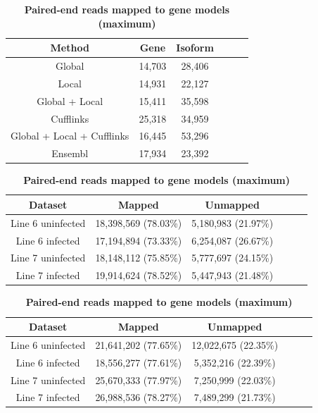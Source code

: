\documentclass[10pt]{article}
\begin{document}
\begin{table}[!ht]
\caption{
\bf{Number of putative genes and isoforms}}
\begin{tabular}{cccccc}
\hline
Method& Gene & Isoform \\ 
\hline
Global & 14,703 & 28,406 \\
Local & 14,931 & 22,127 \\
Global + Local & 15,411 & 35,598 \\
Cufflinks & 25,318 & 34,959 \\
Global + Local + Cufflinks & 16,445 & 53,296\\
Ensembl & 17,934 & 23,392 \\
\hline
\end{tabular}
\label{genes_transcripts}

\caption{
\bf{Single-end reads mapped to gene models (maximum)}}
\begin{tabular}{cccccc}
\hline
Dataset & Mapped & Unmapped \\
\hline
Line 6 uninfected & 18,398,569 (78.03\%) & 5,180,983 (21.97\%) \\
Line 6 infected & 17,194,894 (73.33\%) & 6,254,087 (26.67\%) \\
Line 7 uninfected & 18,148,112 (75.85\%) & 5,777,697 (24.15\%) \\
Line 7 infected & 19,914,624 (78.52\%) & 5,447,943 (21.48\%) \\
\hline
\end{tabular}
\label{single-end_map}

\caption{
\bf{Paired-end reads mapped to gene models (maximum)}}
\begin{tabular}{cccccc}
\hline
Dataset & Mapped & Unmapped \\
\hline
Line 6 uninfected & 21,641,202 (77.65\%) & 12,022,675 (22.35\%) \\
Line 6 infected & 18,556,277 (77.61\%) & 5,352,216 (22.39\%) \\
Line 7 uninfected & 25,670,333 (77.97\%) & 7,250,999 (22.03\%) \\
Line 7 infected & 26,988,536 (78.27\%) & 7,489,299 (21.73\%) \\
\hline
\end{tabular}
\label{paired-end_map}
\end{table}
\end{document}
